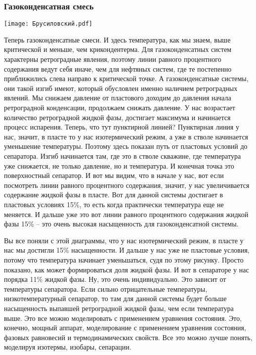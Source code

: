\documentclass[main.tex]{subfiles}
\begin{document}
\subsubsection{Газоконденсатная смесь}

\begin{center}
\texttt{[image: Брусиловский.pdf]}
\end{center}

Теперь газоконденсатные смеси.
И здесь температура, как мы знаем, выше критической и меньше, чем крикондентерма.
Для газоконденсатных систем характерны ретроградные явления, поэтому линии равного процентного содержания ведут себя иначе, чем для нефтяных систем, где те постепенно приближились слева направо к критической точке.
А газоконденсатные системы, они такой изгиб имеют, который обусловлен именно наличием ретроградных явлений.
Мы снижаем давление от пластового доходим до давления начала ретроградной конденсации, продолжаем снижать давление.
У нас возрастает количество ретроградной жидкой фазы, достигает максимума и начинается процесс испарения.
Теперь, что тут пунктирной линией?
Пунктирная линия у нас, значит, в пласте то у нас изотермический режим, а уже в стволе начинается уменьшение температуры.
Поэтому здесь показан путь от пластовых условий до сепаратора.
Изгиб начинается там, где это в стволе скважине, где температура уже снижается, не только давление, но и температура.
И конечная точка это поверхностный сепаратор.
И вот мы видим, что в начале у нас, вот если посмотреть линии равного процентного содержания, значит, у нас увеличивается содержание жидкой фазы в пласте.
Вот для данной системы достигает в пластовых условиях 15\%, то есть когда практически температура еще не меняется.
И дальше уже это вот линии равного процентного содержания жидкой фазы 15\% -- это очень высокая насыщенность для газоконденсатной системы.

Вы все поняли с этой диаграммы, что у нас изотермический режим, в пласте у нас мы достигли 15\% насыщенности.
И дальше у нас уже не пластовые условия, потому что температура начинает уменьшаться, судя по этому рисунку.
Просто показано, как может формироваться доля жидкой фазы.
И вот в сепараторе у нас порядка 11\% жидкой фазы.
Ну, это очень индивидуально.
Это зависит от температуры сепаратора.
Если сильно отрицательные температуры, низкотемпературный сепаратор, то там для данной системы будет больше насыщенность выпавшей ретроградной жидкой фазы, чем если температура выше.
Это все можно моделировать с применением уравнения состояния.
Это, конечно, мощный аппарат, моделирование с применением уравнения состояния, фазовых равновесий и термодинамических свойств.
Все это можно лучше понять, моделируя изотермы, изобары, сепарации.
\end{document}
